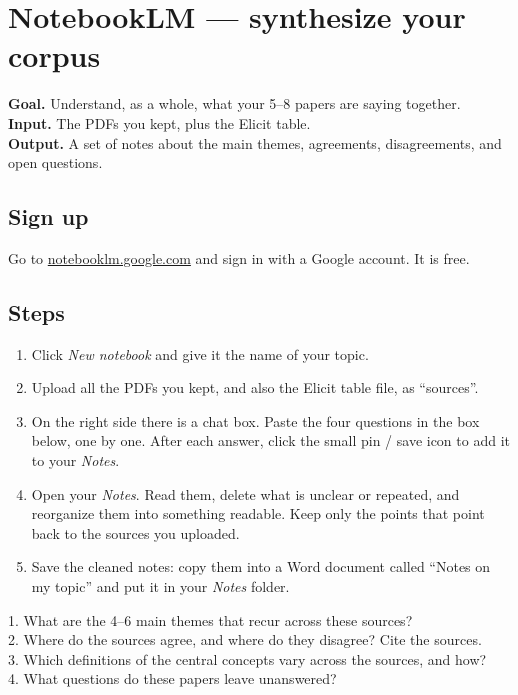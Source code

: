 \documentclass[11pt,a4paper]{article}
\begin{document}
\section{NotebookLM --- synthesize your corpus}
\label{sec:nblm}

\begin{toolheader}
\textbf{Goal.} Understand, as a whole, what your 5--8 papers are saying together.\\
\textbf{Input.} The PDFs you kept, plus the Elicit table.\\
\textbf{Output.} A set of notes about the main themes, agreements, disagreements, and open questions.
\end{toolheader}

\subsection*{Sign up}
Go to \href{https://notebooklm.google.com/}{notebooklm.google.com} and sign in with a Google account. It is free.

\subsection*{Steps}
\begin{enumerate}[leftmargin=*, itemsep=2pt]
  \item Click \emph{New notebook} and give it the name of your topic.
  \item Upload all the PDFs you kept, and also the Elicit table file, as ``sources''.
  \item On the right side there is a chat box. Paste the four questions in the box below, one by one. After each answer, click the small pin / save icon to add it to your \emph{Notes}.
  \item Open your \emph{Notes}. Read them, delete what is unclear or repeated, and reorganize them into something readable. Keep only the points that point back to the sources you uploaded.
  \item Save the cleaned notes: copy them into a Word document called ``Notes on my topic'' and put it in your \emph{Notes} folder.
\end{enumerate}

\begin{promptbox}
1. What are the 4--6 main themes that recur across these sources?\\[2pt]
2. Where do the sources agree, and where do they disagree? Cite the sources.\\[2pt]
3. Which definitions of the central concepts vary across the sources, and how?\\[2pt]
4. What questions do these papers leave unanswered?
\end{promptbox}
\end{document}
